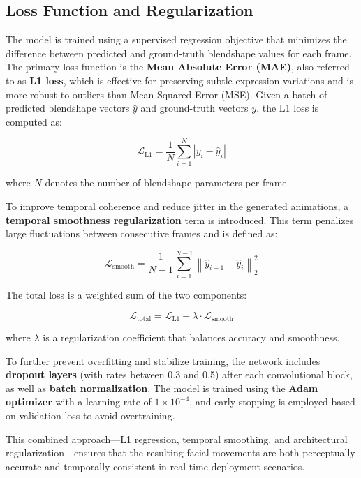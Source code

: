 \documentclass[runningheads]{llncs}
\begin{document}
\subsection{Loss Function and Regularization}

The model is trained using a supervised regression objective that minimizes the difference between predicted and ground-truth blendshape values for each frame. The primary loss function is the \textbf{Mean Absolute Error (MAE)}, also referred to as \textbf{L1 loss}, which is effective for preserving subtle expression variations and is more robust to outliers than Mean Squared Error (MSE). Given a batch of predicted blendshape vectors $\hat{y}$ and ground-truth vectors $y$, the L1 loss is computed as:

\begin{equation}
\mathcal{L}_{\text{L1}} = \frac{1}{N} \sum_{i=1}^{N} \left| y_i - \hat{y}_i \right|
\end{equation}

where $N$ denotes the number of blendshape parameters per frame.

To improve temporal coherence and reduce jitter in the generated animations, a \textbf{temporal smoothness regularization} term is introduced. This term penalizes large fluctuations between consecutive frames and is defined as:

\begin{equation}
\mathcal{L}_{\text{smooth}} = \frac{1}{N - 1} \sum_{i=1}^{N - 1} \left\| \hat{y}_{i+1} - \hat{y}_i \right\|_2^2
\end{equation}

The total loss is a weighted sum of the two components:

\begin{equation}
\mathcal{L}_{\text{total}} = \mathcal{L}_{\text{L1}} + \lambda \cdot \mathcal{L}_{\text{smooth}}
\end{equation}

where $\lambda$ is a regularization coefficient that balances accuracy and smoothness.

To further prevent overfitting and stabilize training, the network includes \textbf{dropout layers} (with rates between 0.3 and 0.5) after each convolutional block, as well as \textbf{batch normalization}. The model is trained using the \textbf{Adam optimizer} with a learning rate of $1 \times 10^{-4}$, and early stopping is employed based on validation loss to avoid overtraining.

This combined approach—L1 regression, temporal smoothing, and architectural regularization—ensures that the resulting facial movements are both perceptually accurate and temporally consistent in real-time deployment scenarios.
\end{document}
